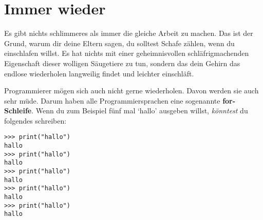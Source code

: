 

\chapter{Immer wieder}\label{ch:againandagain}

Es gibt nichts schlimmeres als immer die gleiche Arbeit zu machen. Das ist der Grund, warum dir deine Eltern sagen, du solltest Schafe zählen, wenn du einschlafen willst. Es hat nichts mit einer geheimnisvollen schläfrigmachenden Eigenschaft dieser wolligen Säugetiere zu tun, sondern das dein Gehirn das endlose wiederholen langweilig findet und leichter einschläft.
\par
Programmierer mögen sich auch nicht gerne wiederholen. Davon werden sie auch sehr müde. Darum haben alle Programmiersprachen eine sogenannte \textbf{for-Schleife}. Wenn du zum Beispiel fünf mal `hallo' ausgeben willst, \emph{könntest} du folgendes schreiben:

\begin{Verbatim}[frame=single]
>>> print("hallo")
hallo
>>> print("hallo")
hallo
>>> print("hallo")
hallo
>>> print("hallo")
hallo
>>> print("hallo")
hallo
\end{Verbatim}

